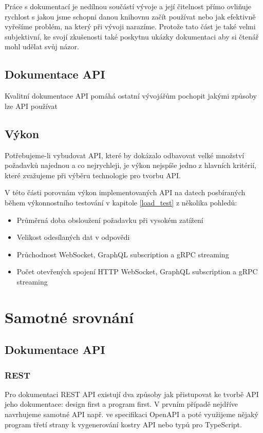 \documentclass[thesis=M,czech]{FITthesis}[2019/12/23]
\begin{document}
Práce s dokumentací je nedílnou součástí vývoje a její čitelnost přímo ovliňuje rychlost s jakou jsme schopni danou knihovnu začít používat nebo jak efektivně vyřešíme problém, na který při vývoji narazíme. Protože tato část je také velmi subjektivní, ke svojí zkušenosti také poskytnu ukázky dokumentaci aby si čtenář mohl udělat svůj názor. 

\subsection{Dokumentace API}
Kvalitní dokumentace API pomáhá ostatní vývojářům pochopit jakými způsoby lze API používat

\subsection{Výkon}
Potřebujeme-li vybudovat API, které by dokázalo odbavovat velké množství požadavků najednou a co nejrychleji, je výkon nejspíše jedno z hlavních kritérií, které zvažujeme při výběru technologie pro tvorbu API.

V této části porovnám výkon implementovaných API na datech posbíraných během výkonnostního testování v kapitole \ref{load_test} z několika pohledů:

\begin{itemize}
    \item Průměrná doba obsloužení požadavku při vysokém zatížení
    \item Velikost odesílaných dat v odpovědi
    \item Průchodnost WebSocket, GraphQL subscription a gRPC streaming
    \item Počet otevřených spojení HTTP WebSocket, GraphQL subscription a gRPC streaming
\end{itemize}

\section{Samotné srovnání}
\subsection*{Dokumentace API}
\subsubsection*{REST}
Pro dokumentaci REST API existují dva způsoby jak přistupovat ke tvorbě API jeho dokumentace: design first a program first.%
V prvním případě nejdříve navrhujeme samotné API např. ve specifikaci OpenAPI a poté využijeme nějaký program třetí strany k vygenerování kostry API nebo typů pro TypeScript.
\end{document}

